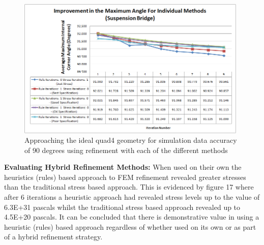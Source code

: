 

\begin{figure}[H]
  \centerline{\includegraphics[width=110mm, scale=1]{../Graphics/FinalReportGraphs/AngleImprovementIndividualMethodsSuspensionBridge.png}}
  \caption{Approaching the ideal quad4 geometry for simulation data accuracy of 90 degrees using refinement with each of the different methods}
  \label{fig:sub1}
\end{figure}  

\noindent


\noindent
 

\noindent
\textbf{Evaluating Hybrid Refinement Methods: }
\noindent
When used on their own the heuristics (rules) based approach to FEM refinement revealed greater stresses than the traditional stress based approach. This is evidenced by figure 17 where after 6 iterations a heuristic approach had revealed stress levels up to the value of 6.3E+31 pascals whilst the traditional stress based approach revealed up to 4.5E+20 pascals. It can be concluded that there is demonstrative value in using a heuristic (rules) based approach regardless of whether used on its own or as part of a hybrid refinement strategy. \\ 

